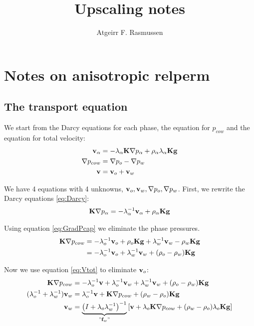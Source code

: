\documentclass[12pt]{article}
\newcommand{\fb}{{\bf f}}
\newcommand{\gb}{{\bf g}}
\newcommand{\vb}{{\bf v}}
\newcommand{\Kb}{{\bf K}}
\begin{document}
\title{Upscaling notes}
\author{Atgeirr F. Rasmussen}


\section{Notes on anisotropic relperm}

\subsection{The transport equation}

We start from the Darcy equations for each phase, the equation for $p_{cow}$ and the equation for total velocity:
\begin{align}
\vb_\alpha & = -\lambda_\alpha\Kb\nabla p_\alpha + \rho_\alpha\lambda_\alpha\Kb\gb \label{eq:Darcy} \\
\nabla p_{cow} & = \nabla p_o - \nabla p_w \label{eq:GradPcap} \\
\vb & = \vb_o + \vb_w \label{eq:Vtot}
\end{align}

We have 4 equations with 4 unknowns, $\vb_o, \vb_w, \nabla p_o, \nabla p_w$. First, we rewrite the Darcy equations \eqref{eq:Darcy}:
\begin{align*}
 \Kb\nabla p_\alpha & = -\lambda_\alpha^{-1}\vb_\alpha + \rho_\alpha\Kb\gb \\
\end{align*}

Using equation \eqref{eq:GradPcap} we eliminate the phase pressures.
\begin{align*}
 \Kb\nabla p_{cow} & = -\lambda_o^{-1}\vb_o + \rho_o\Kb\gb 
  + \lambda_w^{-1}\vb_w - \rho_w\Kb\gb  \\
  & = -\lambda_o^{-1}\vb_o 
  + \lambda_w^{-1}\vb_w + (\rho_o - \rho_w)\Kb\gb  \\
\end{align*}

Now we use equation \eqref{eq:Vtot} to eliminate $\vb_o$:
\begin{align*}
 \Kb\nabla p_{cow}
  & = -\lambda_o^{-1}\vb + \lambda_o^{-1}\vb_w + \lambda_w^{-1}\vb_w + (\rho_o - \rho_w)\Kb\gb  \\
  (\lambda_o^{-1} + \lambda_w^{-1})\vb_w
  & = \lambda_o^{-1}\vb + \Kb\nabla p_{cow} + (\rho_w - \rho_o)\Kb\gb \\
  \vb_w
  & = \underbrace{\left(I + \lambda_o\lambda_w^{-1}\right)^{-1}}_{"\fb_w"}
  \left[\vb + \lambda_o\Kb\nabla p_{cow} + (\rho_w - \rho_o)\lambda_o\Kb\gb\right]
\end{align*}
\end{document}
